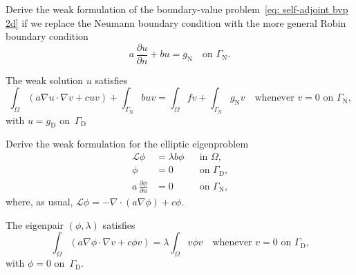\begin{Exercises}

\exercise
Derive the weak formulation of the boundary-value 
problem~\eqref{eq: self-adjoint bvp 2d} if we replace the Neumann boundary 
condition with the more general Robin boundary condition
\[
a\,\frac{\partial u}{\partial n}+bu=g_{\mathrm{N}}
    \quad\text{on $\Gamma_{\mathrm{N}}$.}
\]
\begin{ans}
The weak solution $u$ satisfies 
\[
\int_\Omega(a\nabla u\cdot\nabla v+cuv)+\int_{\Gamma_{\mathrm{N}}}buv
    =\int_\Omega fv+\int_{\Gamma_{\mathrm{N}}}g_{\mathrm{N}}v
    \quad\text{whenever $v=0$ on $\Gamma_{\mathrm{N}}$,}
\]
with $u=g_{\mathrm{D}}$ on~$\Gamma_{\mathrm{D}}$
\end{ans}

\exercise
Derive the weak formulation for the elliptic eigenproblem
\[
\begin{aligned}
\mathcal{L}\phi&=\lambda b\phi&&\text{in $\Omega$},\\
\phi&=0&&\text{on $\Gamma_{\mathrm{D}}$,}\\
a\,\frac{\partial\phi}{\partial n}&=0&&\text{on $\Gamma_{\mathrm{N}}$,}
\end{aligned}
\]
where, as usual, $\mathcal{L}\phi=-\nabla\cdot(a\nabla\phi)+c\phi$.
\begin{ans}
The eigenpair $(\phi,\lambda)$ satisfies
\[
\int_\Omega(a\nabla\phi\cdot\nabla v+c\phi v)=\lambda\int_\Omega v\phi v
\quad\text{whenever $v=0$ on $\Gamma_{\mathrm{D}}$,}
\]
with $\phi=0$ on~$\Gamma_{\mathrm{D}}$.

\end{ans}


\end{Exercises}
